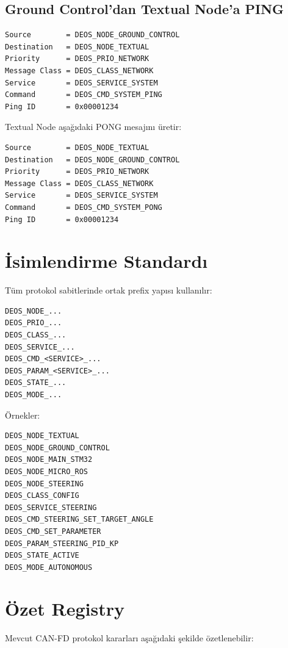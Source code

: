 \documentclass[a4paper,10pt]{article}
\begin{document}
\subsection{Ground Control'dan Textual Node'a PING}

\begin{verbatim}
Source        = DEOS_NODE_GROUND_CONTROL
Destination   = DEOS_NODE_TEXTUAL
Priority      = DEOS_PRIO_NETWORK
Message Class = DEOS_CLASS_NETWORK
Service       = DEOS_SERVICE_SYSTEM
Command       = DEOS_CMD_SYSTEM_PING
Ping ID       = 0x00001234
\end{verbatim}

Textual Node aşağıdaki PONG mesajını üretir:

\begin{verbatim}
Source        = DEOS_NODE_TEXTUAL
Destination   = DEOS_NODE_GROUND_CONTROL
Priority      = DEOS_PRIO_NETWORK
Message Class = DEOS_CLASS_NETWORK
Service       = DEOS_SERVICE_SYSTEM
Command       = DEOS_CMD_SYSTEM_PONG
Ping ID       = 0x00001234
\end{verbatim}


\section{İsimlendirme Standardı}

Tüm protokol sabitlerinde ortak prefix yapısı kullanılır:

\begin{verbatim}
DEOS_NODE_...
DEOS_PRIO_...
DEOS_CLASS_...
DEOS_SERVICE_...
DEOS_CMD_<SERVICE>_...
DEOS_PARAM_<SERVICE>_...
DEOS_STATE_...
DEOS_MODE_...
\end{verbatim}

Örnekler:

\begin{verbatim}
DEOS_NODE_TEXTUAL
DEOS_NODE_GROUND_CONTROL
DEOS_NODE_MAIN_STM32
DEOS_NODE_MICRO_ROS
DEOS_NODE_STEERING
DEOS_CLASS_CONFIG
DEOS_SERVICE_STEERING
DEOS_CMD_STEERING_SET_TARGET_ANGLE
DEOS_CMD_SET_PARAMETER
DEOS_PARAM_STEERING_PID_KP
DEOS_STATE_ACTIVE
DEOS_MODE_AUTONOMOUS
\end{verbatim}


\section{Özet Registry}

Mevcut CAN-FD protokol kararları aşağıdaki şekilde özetlenebilir:
\end{document}
